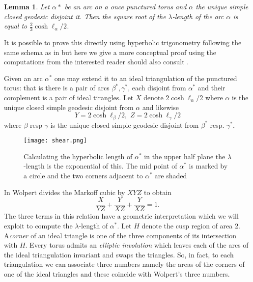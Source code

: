 \documentclass[12pt,a4paper]{amsart}
\newtheorem{lem}[thm]{Lemma}
\begin{document}
\begin{lem}\label{lambda length}
Let $\alpha*$ be an arc on a once punctured torus 
and $\alpha$ the unique 
simple closed geodesic disjoint it.
Then the square root of the $\lambda$-length  of the arc $\alpha$
is equal to $\frac{2}{3}\cosh \ell_\alpha / 2$.
\end{lem}

It is possible to prove this directly using hyperbolic trigonometry 
following the same schema as in \cite{thesis}
but here we give a more conceptual proof  using the computations from \cite{saw}
the interested reader should also consult \cite{yi thesis}.

Given an arc $\alpha^*$ one may extend it to an ideal triangulation of the punctured torus:
that is there is a pair of arcs $\beta^*,\gamma^*$, each disjoint from  $\alpha^*$ and their complement 
is a pair of ideal tirangles. 
Let $X$ denote $2 \cosh \ell_\alpha / 2$ where $\alpha$ is the unique closed simple 
geodesic disjoint from $\alpha$ and likewise
\begin{equation*}
Y = 2 \cosh \ell_\beta / 2 ,\,\, Z  = 2 \cosh \ell_\gamma / 2 
\end{equation*}
where $\beta$ resp $\gamma$ is the unique closed simple  geodesic disjoint from
$\beta^*$ resp. $\gamma^*$.

\begin{figure}[ht]
\begin{center}
\texttt{[image: shear.png]} 
\end{center}
\caption{Calculating the hyperbolic length of $\alpha^*$ in the upper half plane
the $\lambda$-length is the exponential of this.
The mid point of $\alpha^*$ is marked by a circle and
the two corners adjacent to $\alpha^*$ are shaded}
\label{penner}
\end{figure}

In  \cite{saw} Wolpert divides the Markoff cubic by $XYZ$ to obtain
$$\frac{X}{YZ} + \frac{Y}{XZ} + \frac{Y}{XZ} = 1.$$
The three terms in this relation have a geometric interpretation
which we will exploit to compute the $\lambda$-length of $\alpha^*$.
Let $H$ denote the cusp region of area $2$. 
A\textit{corner} of an ideal triangle is one of the 
three components of its intersection with $H$.
Every torus admits an \textit{elliptic involution}
which leaves each of the arcs of the ideal triangulation  invariant
 and swaps the triangles.
So, in fact, to each triangulation we can associate three numbers
namely the areas of the corners of one of the  ideal triangles
and these coincide with Wolpert's three numbers.
\end{document}
